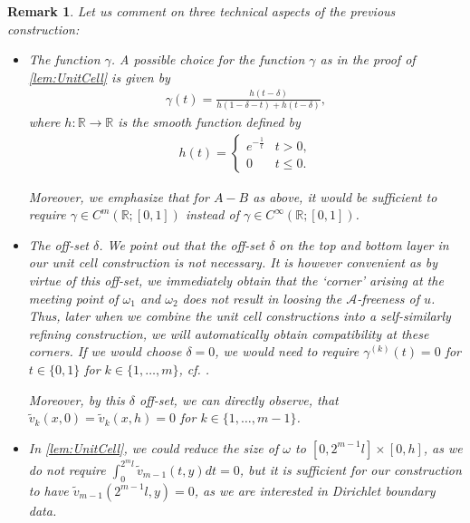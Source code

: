 \documentclass[a4paper, 10pt, twoside, notitlepage]{amsart}
\theoremstyle{plain}
\newtheorem{rmk}[prop]{Remark}
\newcommand{\R}{\mathbb{R}}
\newcommand{\A}{\mathcal{A}}
\begin{document}
		\begin{rmk} \label{rmk:UnitCellRemark} Let us comment on three technical aspects of the previous construction:
			\begin{itemize}
				\item \emph{The function $\gamma$.} A possible choice for the function $\gamma$ as in the proof of \cref{lem:UnitCell} is given by
				\begin{align*}
					\gamma(t) = \frac{h(t-\delta)}{h(1-\delta-t)+h(t-\delta)},
				\end{align*}
				where $h: \R \to \R$ is the smooth function defined by
				\begin{align*}
					h(t) = \begin{cases} e^{-\frac{1}{t}} & t>0,\\ 0 & t \leq 0. \end{cases}
				\end{align*}
				
				Moreover, we emphasize that for $A-B $ as above, it would be sufficient to require $\gamma \in C^m(\R;[0,1])$ instead of $\gamma \in C^\infty(\R;[0,1])$.
				
				\item \emph{The off-set $\delta$.} We  point out that the off-set $\delta$ on the top and bottom layer in our unit cell construction  is not necessary.  It is however convenient
				as by virtue of this off-set, we immediately obtain that the `corner' arising at the meeting point of $\omega_1$ and $\omega_2$ does not result in loosing the $\A$-freeness of $u$. Thus, later
				when we combine the unit cell constructions into a self-similarly refining construction, we will automatically obtain compatibility at these corners.  If we would choose $\delta = 0$, we would  need to require
				$\gamma^{(k)}(t) = 0$ for $ t \in \{0,1\}$ for $k \in\{ 1,\dots,m\}$, cf. \cite{CC15}.

                                Moreover, by this $\delta$ off-set, we can directly observe, that $\tilde{v}_k(x,0) = \tilde{v}_k(x,h) =0$ for $k\in \{1,\dots,m-1\}$.
                                
                                \item In \cref{lem:UnitCell}, we could reduce the size of $\omega$ to $[0,2^{m-1}l] \times [0,h]$, as we do not require $\int_0^{2^ml} \tilde{v}_{m-1}(t,y)dt = 0$, but it is sufficient for our construction to have $\tilde{v}_{m-1}(2^{m-1}l,y) = 0$, as we are interested in Dirichlet boundary data.
                                  
			\end{itemize}
		\end{rmk}
		
\end{document}
